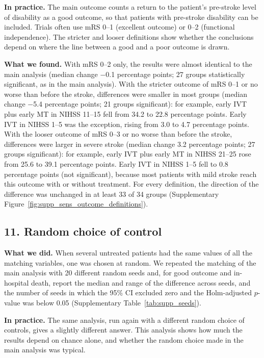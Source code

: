 \textbf{In practice.} The main outcome counts a return to the patient's pre-stroke level of disability as a good outcome, so that patients with pre-stroke disability can be included. Trials often use mRS 0--1 (excellent outcome) or 0--2 (functional independence). The stricter and looser definitions show whether the conclusions depend on where the line between a good and a poor outcome is drawn.

\textbf{What we found.} With mRS 0--2 only, the results were almost identical to the main analysis (median change $-$0.1 percentage points; 27 groups statistically significant, as in the main analysis). With the stricter outcome of mRS 0--1 or no worse than before the stroke, differences were smaller in most groups (median change $-$5.4 percentage points; 21 groups significant): for example, early IVT plus early MT in NIHSS 11--15 fell from 34.2 to 22.8 percentage points. Early IVT in NIHSS 1--5 was the exception, rising from 3.0 to 4.7 percentage points. With the looser outcome of mRS 0--3 or no worse than before the stroke, differences were larger in severe stroke (median change 3.2 percentage points; 27 groups significant): for example, early IVT plus early MT in NIHSS 21--25 rose from 25.6 to 39.1 percentage points. Early IVT in NIHSS 1--5 fell to 0.8 percentage points (not significant), because most patients with mild stroke reach this outcome with or without treatment. For every definition, the direction of the difference was unchanged in at least 33 of 34 groups (Supplementary Figure~\ref{fig:supp_sens_outcome_definitions}).

\subsection*{11. Random choice of control}

\textbf{What we did.} When several untreated patients had the same values of all the matching variables, one was chosen at random. We repeated the matching of the main analysis with 20 different random seeds and, for good outcome and in-hospital death, report the median and range of the difference across seeds, and the number of seeds in which the 95\% CI excluded zero and the Holm-adjusted $p$-value was below 0.05 (Supplementary Table~\ref{tab:supp_seeds}).

\textbf{In practice.} The same analysis, run again with a different random choice of controls, gives a slightly different answer. This analysis shows how much the results depend on chance alone, and whether the random choice made in the main analysis was typical.

